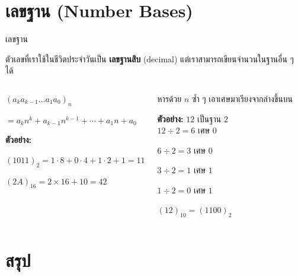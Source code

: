 \documentclass[11pt, aspectratio=169]{beamer}
\begin{document}
\section{เลขฐาน (Number Bases)}

\begin{frame}{เลขฐาน}
  \begin{explanation}[แนวคิด]
    ตัวเลขที่เราใช้ในชีวิตประจำวันเป็น \textbf{เลขฐานสิบ} (decimal)
    แต่เราสามารถเขียนจำนวนในฐานอื่น ๆ ได้
  \end{explanation}

  \begin{columns}[T]
      \begin{exambox}
        $(a_k a_{k-1} \ldots a_1 a_0)_n$

        $= a_k n^k + a_{k-1} n^{k-1} + \cdots + a_1 n + a_0$

        \textbf{ตัวอย่าง:}

        $(1011)_2 = 1\cdot8 + 0\cdot4 + 1\cdot2 + 1 = 11$

        $(2A)_{16} = 2 \times 16 + 10 = 42$
      \end{exambox}
      \begin{exambox}
        หารด้วย $n$ ซํ้า ๆ เอาเศษมาเรียงจากล่างขึ้นบน

        \textbf{ตัวอย่าง:} $12$ เป็นฐาน $2$ \\
        $12 \div 2 = 6$ เศษ $0$

        $6 \div 2 = 3$ เศษ $0$

        $3 \div 2 = 1$ เศษ $1$

        $1 \div 2 = 0$ เศษ $1$

        $(12)_{10} = (1100)_2$
      \end{exambox}
  \end{columns}
\end{frame}

\section{สรุป}
\end{document}
